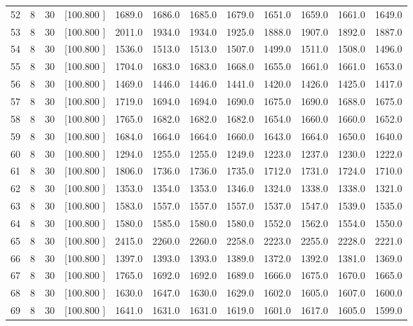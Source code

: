 \documentclass[12pt,a4paper]{article}
\begin{document}
\begin{center}
{\begin{tabular}{r r r r r r r r r r r r}
  52&  8& 30&[100.800   ]&  1689.0&  1686.0&  1685.0&  1679.0&  1651.0&  1659.0&  1661.0&  1649.0\\[-0.02in]
  53&  8& 30&[100.800   ]&  2011.0&  1934.0&  1934.0&  1925.0&  1888.0&  1907.0&  1892.0&  1887.0\\[-0.02in]
  54&  8& 30&[100.800   ]&  1536.0&  1513.0&  1513.0&  1507.0&  1499.0&  1511.0&  1508.0&  1496.0\\[-0.02in]
  55&  8& 30&[100.800   ]&  1704.0&  1683.0&  1683.0&  1668.0&  1655.0&  1661.0&  1661.0&  1653.0\\[-0.02in]
  56&  8& 30&[100.800   ]&  1469.0&  1446.0&  1446.0&  1441.0&  1420.0&  1426.0&  1425.0&  1417.0\\[-0.02in]
  57&  8& 30&[100.800   ]&  1719.0&  1694.0&  1694.0&  1690.0&  1675.0&  1690.0&  1688.0&  1675.0\\[-0.02in]
  58&  8& 30&[100.800   ]&  1765.0&  1682.0&  1682.0&  1682.0&  1654.0&  1660.0&  1660.0&  1652.0\\[-0.02in]
  59&  8& 30&[100.800   ]&  1684.0&  1664.0&  1664.0&  1660.0&  1643.0&  1664.0&  1650.0&  1640.0\\[-0.02in]
  60&  8& 30&[100.800   ]&  1294.0&  1255.0&  1255.0&  1249.0&  1223.0&  1237.0&  1230.0&  1222.0\\[-0.02in]
  61&  8& 30&[100.800   ]&  1806.0&  1736.0&  1736.0&  1735.0&  1712.0&  1731.0&  1724.0&  1710.0\\[-0.02in]
  62&  8& 30&[100.800   ]&  1353.0&  1354.0&  1353.0&  1346.0&  1324.0&  1338.0&  1338.0&  1321.0\\[-0.02in]
  63&  8& 30&[100.800   ]&  1583.0&  1557.0&  1557.0&  1557.0&  1537.0&  1547.0&  1539.0&  1535.0\\[-0.02in]
  64&  8& 30&[100.800   ]&  1580.0&  1585.0&  1580.0&  1580.0&  1552.0&  1562.0&  1554.0&  1550.0\\[-0.02in]
  65&  8& 30&[100.800   ]&  2415.0&  2260.0&  2260.0&  2258.0&  2223.0&  2255.0&  2228.0&  2221.0\\[-0.02in]
  66&  8& 30&[100.800   ]&  1397.0&  1393.0&  1393.0&  1389.0&  1372.0&  1392.0&  1381.0&  1369.0\\[-0.02in]
  67&  8& 30&[100.800   ]&  1765.0&  1692.0&  1692.0&  1689.0&  1666.0&  1675.0&  1670.0&  1665.0\\[-0.02in]
  68&  8& 30&[100.800   ]&  1630.0&  1647.0&  1630.0&  1629.0&  1602.0&  1605.0&  1607.0&  1600.0\\[-0.02in]
  69&  8& 30&[100.800   ]&  1641.0&  1631.0&  1631.0&  1619.0&  1601.0&  1617.0&  1605.0&  1599.0\\[-0.02in]

\end{tabular}}
\end{center}
\end{document}
